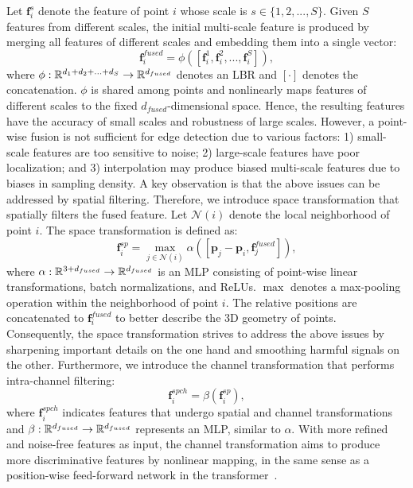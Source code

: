 \documentclass[sigconf]{acmart}
\begin{document}
Let $\textbf{f}^s_i$ denote the feature of point $i$ whose scale is $s \in \{1,2,...,S\}$. Given $S$ features from different scales, the initial multi-scale feature is produced by merging all features of different scales and embedding them into a single vector: 
\begin{equation}\label{eq: initial fusion}
    \textbf{f}_i^{fused} = \phi \left(\left[\textbf{f}_i^1, \textbf{f}_i^2, ..., \textbf{f}_i^S\right]\right),
\end{equation}
where $\phi:\mathbb{R}^{d_1+ d_2 + ... + d_S} \to \mathbb{R}^{d_{fused}}$ denotes an LBR and $[\cdot]$ denotes the concatenation. $\phi$ is shared among points and nonlinearly maps features of different scales to the fixed $d_{fused}$-dimensional space. Hence, the resulting features have the accuracy of small scales and robustness of large scales.
However, a point-wise fusion is not sufficient for edge detection due to various factors: 1) small-scale features are too sensitive to noise; 2) large-scale features have poor localization; and 3) interpolation may produce biased multi-scale features due to biases in sampling density. 
A key observation is that the above issues can be addressed by spatial filtering.  
Therefore, we introduce space transformation that spatially filters the fused feature. Let $\mathcal{N}(i)$ denote the local neighborhood of point $i$. The space transformation is defined as: 
\begin{equation}\label{eq: space trans}
    \textbf{f}^{sp}_i = \max_{j\in\mathcal{N}(i)} \alpha \left(\left[\textbf{p}_j-\textbf{p}_i, \textbf{f}_j^{fused}\right]\right),
\end{equation}
where $\alpha:\mathbb{R}^{3+d_{fused}} \to \mathbb{R}^{d_{fused}}$ is an MLP consisting of point-wise linear transformations, batch normalizations, and ReLUs. $\max$ denotes a max-pooling operation within the neighborhood of point $i$. The relative positions are concatenated to $\textbf{f}^{fused}_i$ to better describe the 3D geometry of points. Consequently, the space transformation strives to address the above issues by sharpening important details on the one hand and smoothing harmful signals on the other. 
Furthermore, we introduce the channel transformation that performs intra-channel filtering:
\begin{equation}\label{eq: channel trans}
    \textbf{f}_i^{spch} = \beta \left(\textbf{f}^{sp}_i \right),
\end{equation}
where $\textbf{f}_i^{spch}$ indicates features that undergo spatial and channel transformations and $\beta:\mathbb{R}^{d_{fused}} \to \mathbb{R}^{d_{fused}}$ represents an MLP, similar to $\alpha$. 
With more refined and noise-free features as input, the channel transformation aims to produce more discriminative features by nonlinear mapping, in the same sense as a position-wise feed-forward network in the transformer~\cite{vaswani2017attention}.
\end{document}
